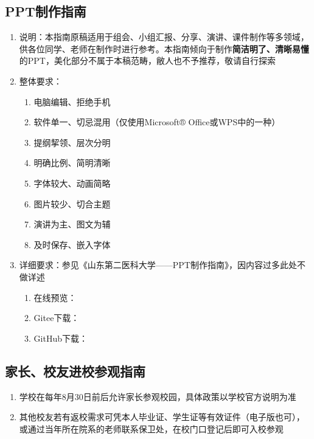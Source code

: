 \subsection[PPT制作指南]{PPT制作指南}
\begin{enumerate}
    \item 说明：本指南原稿适用于组会、小组汇报、分享、演讲、课件制作等多领域，供各位同学、老师在制作时进行参考。本指南倾向于制作\textbf{简洁明了、清晰易懂}的PPT，美化部分不属于本稿范畴，敝人也不予推荐，敬请自行探索
    \item 整体要求：
          \begin{enumerate}
              \item 电脑编辑、拒绝手机
              \item 软件单一、切忌混用（仅使用Microsoft® Office或WPS中的一种）
              \item 提纲挈领、层次分明
              \item 明确比例、简明清晰
              \item 字体较大、动画简略
              \item 图片较少、切合主题
              \item 演讲为主、图文为辅
              \item 及时保存、嵌入字体
          \end{enumerate}
    \item 详细要求：参见《山东第二医科大学——PPT制作指南》，因内容过多此处不做详述
          \begin{enumerate}
              \item 在线预览：
              \item Gitee下载：
              \item GitHub下载：
          \end{enumerate}
\end{enumerate}

\subsection[家长、校友进校参观指南]{家长、校友进校参观指南\footnotemark}
\begin{enumerate}
    \item 学校在每年8月30日前后允许家长参观校园\footnotemark，具体政策以学校官方说明为准
    \item 其他校友若有返校需求可凭本人毕业证、学生证等有效证件（电子版也可），或通过当年所在院系的老师联系保卫处，在校门口登记后即可入校参观
\end{enumerate}

